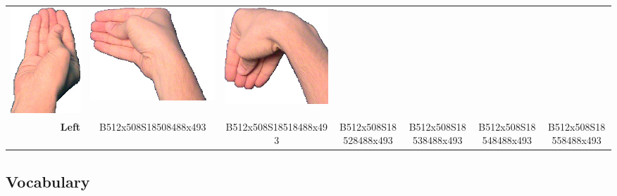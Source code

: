 \documentclass{article}
\begin{document}
\begin{center}
\begin{tabular}{r*{6}{c}}
\includegraphics[scale=0.1]{images/05-21-4.jpg}&
\includegraphics[scale=0.1]{images/05-21-5.jpg}&
\includegraphics[scale=0.1]{images/05-21-6.jpg}\\
\textbf{Left}&
B512x508S18508488x493&
B512x508S18518488x493&
B512x508S18528488x493&
B512x508S18538488x493&
B512x508S18548488x493&
B512x508S18558488x493\\
\end{tabular}
\end{center}

\subsection{Vocabulary}
\end{document}
